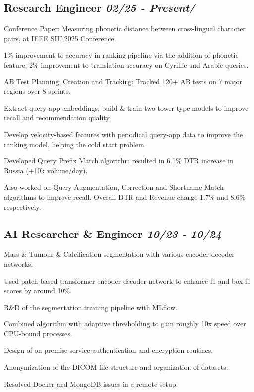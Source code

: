 \documentclass[letter, 14pt]{article}
\begin{document}
\subsection{Research Engineer \hfill \textit{\textmd{02/25 - Present/}}}
\begin{zitemize}
\item Conference Paper: Measuring phonetic distance between cross-lingual character pairs, at IEEE SIU 2025 Conference. \href{https://ieeexplore.ieee.org/abstract/document/11112305}{\color{black}\externallink} \\
\item 1\% improvement to accuracy in ranking pipeline via the addition of phonetic feature, 2\% improvement to translation accuracy on Cyrillic and Arabic queries.
\item AB Test Planning, Creation and Tracking: Tracked 120+ AB tests on 7 major regions over 8 sprints.
\item Extract query-app embeddings, build \& train two-tower type models to improve recall and recommendation quality.
\item Develop velocity-based features with periodical query-app data to improve the ranking model, helping the cold start problem.
\item Developed Query Prefix Match algorithm resulted in 6.1\% DTR increase in Russia (+10k volume/day).
\item Also worked on Query Augmentation, Correction and Shortname Match algorithms to improve recall. Overall DTR and Revenue change 1.7\% and 8.6\% respectively. 
\item 
\end{zitemize}

\subsection{AI Researcher \& Engineer \hfill \textit{\textmd{10/23 - 10/24}}}
\begin{zitemize}
\item Mass \& Tumour \& Calcification segmentation with various encoder-decoder networks.
\item Used patch-based transformer encoder-decoder network to enhance f1 and box f1 scores by around 10\%.
\item R\&D of the segmentation training pipeline with MLflow.
\item Combined \href{https://www.epfl.ch/labs/ivrl/research/slic-superpixels/}{\color{black}{SLIC}} algorithm with adaptive thresholding to gain roughly 10x speed over CPU-bound processes.
\item Design of on-premise service authentication and encryption routines.
\item Anonymization of the DICOM file structure and organization of datasets.
\item Resolved Docker and MongoDB issues in a remote setup. 
\end{zitemize}
\end{document}
